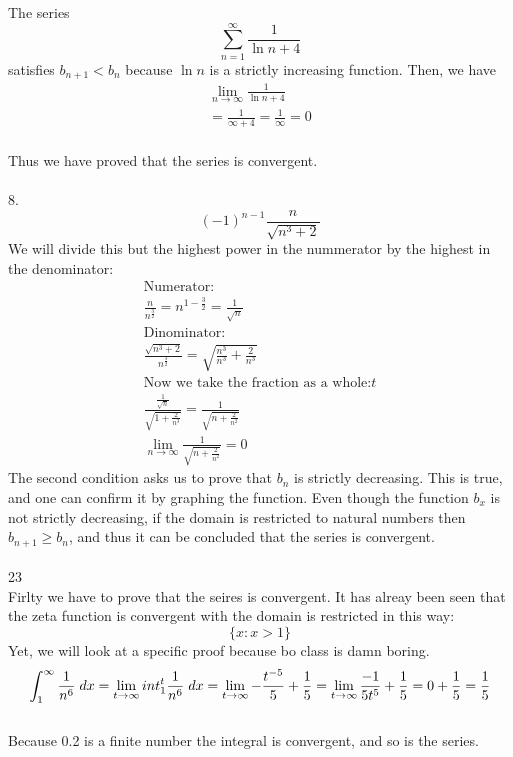 \documentclass{article}
\begin{document}
The series $$\sum^{\infty}_{n=1}\frac{1}{\ln{n}+4}$$ satisfies $b_{n+1}<b_{n}$ because $\ln{n}$ is a strictly increasing function. Then, we have
\begin{gather*}
\lim_{n\to\infty}\frac{1}{\ln{n}+4}
\\=\frac{1}{\infty+4}=\frac{1}{\infty}=0
\end{gather*}
\\Thus we have proved that the series is convergent.
\\\\8. $$(-1)^{n-1}\frac{n}{\sqrt{n^3+2}}$$
We will divide this but the highest power in the nummerator by the highest in the denominator:
\begin{gather*}
\text{Numerator:}
\\\frac{n}{n^{\frac{3}{2}}}=n^{1-\frac{3}{2}}=\frac{1}{\sqrt{n}}
\\\text{Dinominator:}
\\\frac{\sqrt{n^3+2}}{n^{\frac{3}{2}}}=\sqrt{\frac{n^3}{n^3}+\frac{2}{n^3}}
\\\text{Now we take the fraction as a whole:}t
\\\frac{\frac{1}{\sqrt{n}}}{\sqrt{1+\frac{2}{n^3}}}=\frac{1}{\sqrt{n+\frac{2}{n^2}}}
\\\lim_{n\to\infty}\frac{1}{\sqrt{n+\frac{2}{n^2}}}=0
\end{gather*}
The second condition asks us to prove that $b_n$ is strictly decreasing. This is true, and one can confirm it by graphing the function. Even though the function $b_x$ is not strictly decreasing, if the domain is restricted to natural numbers then $b_{n+1}\geq b_n$, and thus it can be concluded that the series is convergent.
\\
\\23
\\Firlty we have to prove that the seires is convergent. It has alreay been seen that the zeta function is convergent with the domain is restricted in this way: $$\{x: x>1\}$$
Yet, we will look at a specific proof because bo class is damn boring.
\begin{gather*}
\int^{\infty}_{1} \frac{1}{n^6}\hspace{1mm}dx=\lim_{t\to\infty}int^{t}_{1} \frac{1}{n^6}\hspace{1mm}dx=\lim_{t\to\infty} -\frac{t^{-5}}{5}+\frac{1}{5}=\lim_{t\to\infty} \frac{-1}{5t^{5}}+\frac{1}{5}=0+\frac{1}{5}=\frac{1}{5}
\end{gather*}
\\Because 0.2 is a finite number the integral is convergent, and so is the series.
\end{document}

